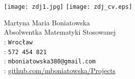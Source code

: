 \documentclass[11pt]{article}
\newcommand*{\myfont}{\fontfamily{qag}\selectfont}
\begin{document}
\thispagestyle{empty} 
\begin{minipage}{0.25\textwidth}
\ifpdf
\texttt{[image: zdj1.jpg]}
\else
\texttt{[image: zdj\_cv.eps]}
\fi
\end{minipage}
\begin{minipage}{0.75\textwidth}
\vskip 15pt
{\color{BrickRed}\huge\myfont Martyna Maria Boniatowska}\\[15pt]
{\color{BrickRed}\large\myfont Absolwentka Matematyki Stosowanej}\\[15pt]
 :  \texttt{Wrocław} \\[10pt]
 :  \texttt{572 454 821}\\[10pt]
 : \texttt{mboniatowska380@gmail.com}\\[10pt]
 : \url{github.com/mboniatowska/Projects}
\end{minipage}
\newline
\end{document}
